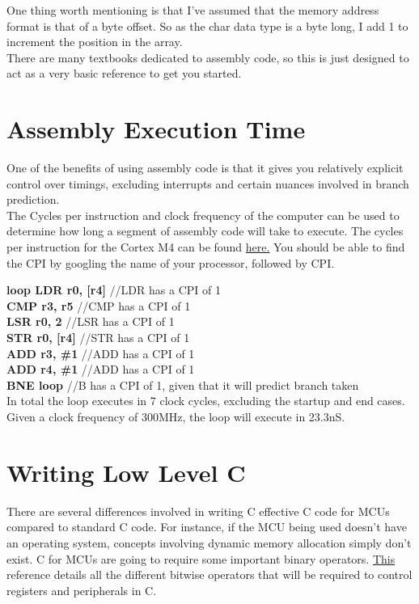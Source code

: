 \documentclass[10pt]{article}
\begin{document}
\* One thing worth mentioning is that I've assumed that the memory address format is that of a byte offset. So as the char data type is a byte long, I add 1 to increment the position in the array. \\

There are many textbooks dedicated to assembly code, so this is just designed to act as a very basic reference to get you started.

\section{Assembly Execution Time}
One of the benefits of using assembly code is that it gives you relatively explicit control over timings, excluding interrupts and certain nuances involved in branch prediction. \\

The Cycles per instruction and clock frequency of the computer can be used to determine how long a segment of assembly code will take to execute. The cycles per instruction for the Cortex M4 can be found \href{http://infocenter.arm.com/help/index.jsp?topic=/com.arm.doc.ddi0439b/CHDDIGAC.html}{here.} You should be able to find the CPI by googling the name of your processor, followed by CPI.

\textbf{loop    \indent    LDR r0, [r4]} //LDR has a CPI of 1 \\
\indent\indent\indent\textbf{CMP r3, r5} //CMP has a CPI of 1\\
\indent\indent\indent\textbf{LSR r0, 2} //LSR has a CPI of 1\\
\indent\indent\indent\textbf{STR r0, [r4]} //STR has a CPI of 1\\
\indent\indent\indent\textbf{ADD r3, \#1} //ADD has a CPI of 1\\
\indent\indent\indent\textbf{ADD r4, \#1} //ADD has a CPI of 1\\
\indent\indent\indent\textbf{BNE loop} //B has a CPI of 1, given that it will predict branch taken\\

In total the loop executes in 7 clock cycles, excluding the startup and end cases. Given a clock frequency of 300MHz, the loop will execute in 23.3nS.

\section{Writing Low Level C}
There are several differences involved in writing C effective C code for MCUs compared to standard C code. For instance, if the MCU being used doesn't have an operating system, concepts involving dynamic memory allocation simply don't exist. C for MCUs are going to require some important binary operators. \href{http://www.tutorialspoint.com/cprogramming/c_bitwise_operators.htm}{This} reference details all the different bitwise operators that will be required to control registers and peripherals in C.\\
\end{document}
